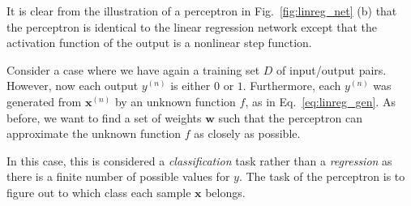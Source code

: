 \documentclass[dissertation,nocontribution,draft*]{aaltoseries}
\newcommand{\vect}[1]{\mathbf{#1}}
\newcommand{\vx}[0]{\vect{x}}
\newcommand{\vw}[0]{\vect{w}}
\begin{document}
It is clear from the illustration of a perceptron in
Fig.~\ref{fig:linreg_net} (b) that the perceptron is
identical to the linear regression network except that the
activation function of the output is a nonlinear step
function.

Consider a case where we have again a training set
$D$ of input/output pairs. However, now each output
$y^{(n)}$ is either $0$ or $1$. Furthermore, each $y^{(n)}$
was generated from $\vx^{(n)}$ by an unknown
function $f$, as in Eq.~\eqref{eq:linreg_gen}. As 
before, we want to find a set of weights $\vw$ such that the
perceptron can approximate the unknown function $f$ as
closely as possible.

In this case, this is considered a \textit{classification}
task rather than a \textit{regression} as there is a
finite number of possible values for $y$. The task of the
perceptron is to figure out to which class each sample $\vx$
belongs.
\end{document}
